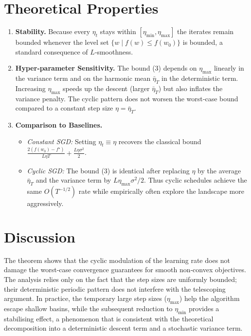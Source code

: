\documentclass{article}
\begin{document}
\section*{Theoretical Properties}
\begin{enumerate}[label=\arabic*. , leftmargin=*]
\item \textbf{Stability.} Because every $\eta_{t}$ stays within $[\eta_{\min},\eta_{\max}]$
the iterates remain bounded whenever the level set $\{w\mid f(w)\le f(w_{0})\}$ is bounded,
a standard consequence of $L$‑smoothness.

\item \textbf{Hyper‑parameter Sensitivity.} The bound (3) depends on
$\eta_{\max}$ linearly in the variance term and on the harmonic mean
$\bar\eta_{T}$ in the deterministic term. Increasing $\eta_{\max}$ speeds up
the descent (larger $\bar\eta_{T}$) but also inflates the variance penalty.
The cyclic pattern does not worsen the worst‑case bound compared to a
constant step size $\eta=\bar\eta_{T}$.

\item \textbf{Comparison to Baselines.}
\begin{itemize}
\item \emph{Constant SGD:} Setting $\eta_{t}\equiv\eta$ recovers the classical bound
$\frac{2(f(w_{0})-f^{\star})}{L\eta T}+ \frac{L\eta\sigma^{2}}{2}$.
\item \emph{Cyclic SGD:} The bound (3) is identical after replacing $\eta$ by the
average $\bar\eta_{T}$ and the variance term by $L\eta_{\max}\sigma^{2}/2$.
Thus cyclic schedules achieve the same $O(T^{-1/2})$ rate while empirically
often explore the landscape more aggressively.
\end{itemize}
\end{enumerate}

\section*{Discussion}
The theorem shows that the cyclic modulation of the learning rate does not
damage the worst‑case convergence guarantees for smooth non‑convex objectives.
The analysis relies only on the fact that the step sizes are uniformly bounded;
their deterministic periodic pattern does not interfere with the telescoping
argument.  In practice, the temporary large step sizes ($\eta_{\max}$) help the
algorithm escape shallow basins, while the subsequent reduction to $\eta_{\min}$
provides a stabilising effect, a phenomenon that is consistent with the
theoretical decomposition into a deterministic descent term and a stochastic
variance term.
\end{document}
